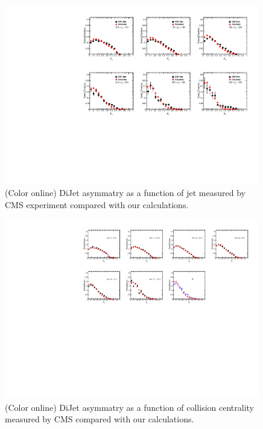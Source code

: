 \documentclass[reprint,amsmath,amssymb,aps,showpacs,showkeys]{revtex4}
\begin{document}
\begin{figure}
  \includegraphics[width=0.99\textwidth]{Figures/Fig_Asym_DiJet_Pt.pdf}
  \caption{(Color online) DiJet asymmatry as a function of jet \pt measured by CMS experiment
    compared with our calculations.}
  \label{Fig:DiJetAsymPt}
\end{figure}



\begin{figure}
  \includegraphics[width=0.99\textwidth]{Figures/Fig_Asym_DiJet_Centrality.pdf}
  \caption{(Color online) DiJet asymmatry as a function of collision centrality
    measured by CMS compared with our calculations.}
  \label{Fig:DiJetAsymCent}
\end{figure}
\end{document}
